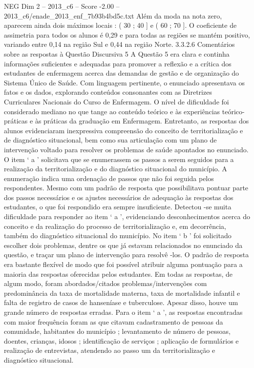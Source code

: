 \begin{textsample}{NEG Dim 2 – 2013\_c6 – Score -2.00 – 2013\_c6/enade\_2013\_enf\_7b93b4bd5c.txt}
Além da moda na nota zero, aparecem ainda dois máximos locais : ( 30 ; 40 ] e ( 60 ; 70 ].
O coeficiente de assimetria para todos os alunos é 0,29 e para todas as regiões se mantém positivo, variando entre 0,14 na região Sul e 0,44 na região Norte. 3.3.2.6 Comentários sobre as respostas à Questão Discursiva 5 A Questão 5 era clara e continha informações suficientes e adequadas para promover a reflexão e a crítica dos estudantes de enfermagem acerca das demandas de gestão e de organização do Sistema Único de Saúde.
Com linguagem pertinente, o enunciado apresentava os fatos e os dados, explorando conteúdos consonantes com as Diretrizes Curriculares Nacionais do Curso de Enfermagem.
O nível de dificuldade foi considerado mediano no que tange ao conteúdo teórico e às experiências teórico-práticas e às práticas da graduação em Enfermagem.
Entretanto, as respostas dos alunos evidenciaram inexpressiva compreensão do conceito de territorialização e de diagnóstico situacional, bem como sua articulação com um plano de intervenção voltado para resolver os problemas de saúde apontados no enunciado.
O item ‘ a ’ solicitava que se enumerassem os passos a serem seguidos para a realização da territorialização e do diagnóstico situacional do município.
A enumeração indica uma ordenação de passos que não foi seguida pelos respondentes.
Mesmo com um padrão de resposta que possibilitava pontuar parte dos passos necessários e os ajustes necessários de adequação às respostas dos estudantes, o que foi respondido era sempre insuficiente.
Detectou -se muita dificuldade para responder ao item ‘ a ’, evidenciando desconhecimentos acerca do conceito e da realização do processo de territorialização e, em decorrência, também do diagnóstico situacional do município.
No item ‘ b ’ foi solicitado escolher dois problemas, dentre os que já estavam relacionados no enunciado da questão, e traçar um plano de intervenção para resolvê -los.
O padrão de resposta era bastante flexível de modo que foi possível atribuir alguma pontuação para a maioria das respostas oferecidas pelos estudantes.
Em todas as respostas, de algum modo, foram abordados/citados problemas/intervenções com predominância da taxa de mortalidade materna, taxa de mortalidade infantil e falta de registro de casos de hanseníase e tuberculose.
Apesar disso, houve um grande número de respostas erradas.
Para o item ‘ a ’, as respostas encontradas com maior frequência foram as que citavam cadastramento de pessoas da comunidade, habitantes do município ; levantamento de número de pessoas, doentes, crianças, idosos ; identificação de serviços ; aplicação de formulários e realização de entrevistas, atendendo ao passo um da territorialização e diagnóstico situacional.

\end{textsample}
